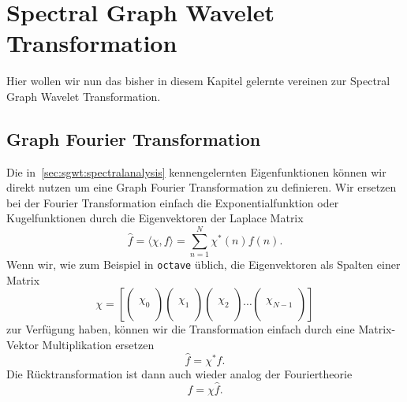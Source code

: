
\section{Spectral Graph Wavelet Transformation\label{sec:sgwt:wavelets}}

Hier wollen wir nun das bisher in diesem Kapitel gelernte vereinen zur Spectral 
Graph Wavelet Transformation.

\subsection{Graph Fourier Transformation\label{subsec:sgwt:gft}}

Die in~\cref{sec:sgwt:spectralanalysis} kennengelernten Eigenfunktionen 
k\"onnen wir direkt nutzen um eine Graph Fourier Transformation zu definieren. 
Wir ersetzen bei der Fourier Transformation einfach die Exponentialfunktion 
oder Kugelfunktionen durch die Eigenvektoren der Laplace Matrix
\begin{equation*}
\hat{f} = \langle \chi, f \rangle = \sum_{n = 1}^{N} \chi^*(n)f(n).
\end{equation*}
Wenn wir, wie zum Beispiel in \texttt{octave} \"ublich, die Eigenvektoren als 
Spalten einer Matrix
\begin{equation}
\chi = 
\left[
\begin{pmatrix}\\\chi_0\\\\\end{pmatrix}
\begin{pmatrix}\\\chi_1\\\\\end{pmatrix}
\begin{pmatrix}\\\chi_2\\\\\end{pmatrix}
\cdots
\begin{pmatrix}\\\chi_{N-1}\\\\\end{pmatrix}
\right]
\end{equation}
zur Verf\"ugung haben, k\"onnen wir die Transformation 
einfach durch eine Matrix-Vektor Multiplikation ersetzen
\begin{equation*}
\hat{f} = \chi^* f.
\end{equation*}
Die R\"ucktransformation ist dann auch wieder analog der Fouriertheorie
\begin{equation*}
f = \chi \hat{f}.
\end{equation*}

